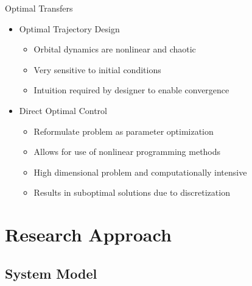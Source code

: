 \documentclass[11pt,professionalfonts]{beamer}
\begin{document}
\begin{frame}{Optimal Transfers} %

\begin{itemize}
    \item Optimal Trajectory Design
        \begin{itemize}
            \item Orbital dynamics are nonlinear and chaotic
            \item Very sensitive to initial conditions
            \item Intuition required by designer to enable convergence
        \end{itemize}
    \pause
    \item Direct Optimal Control
        \begin{itemize}
            \item Reformulate problem as parameter optimization
            \item Allows for use of nonlinear programming methods
            \item High dimensional problem and computationally intensive
            \item Results in suboptimal solutions due to discretization
        \end{itemize}
\end{itemize}
\end{frame}   %

\section*{Research Approach}
\subsection*{System Model}
\end{document}
